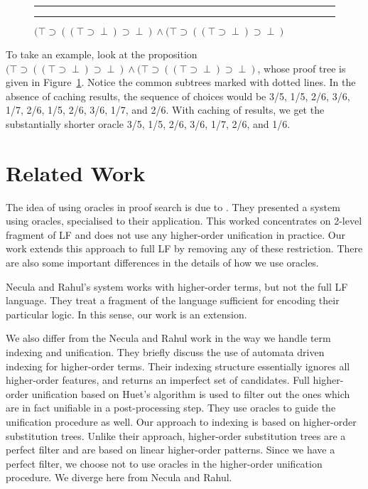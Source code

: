 \documentclass{acmconf}
\newcommand{\figfoot}{\vspace{1ex}\hrule}
\newcommand{\fighead}{\hrule\vspace{1.5ex}}
\begin{document}
\begin{figure}
\fighead
\hspace{-0.5in}
\vspace{1.5in}
\caption{\label{prooftree3}
$(\top\supset((\top\supset\perp)\supset\perp) \wedge
(\top\supset((\top\supset\perp)\supset\perp)$}
\figfoot
\end{figure}

To take an example, look at the proposition
$(\top\supset((\top\supset\perp)\supset\perp) \wedge
(\top\supset((\top\supset\perp)\supset\perp)$, whose proof tree is
given in Figure~\ref{prooftree3}. Notice the common subtrees marked
with dotted lines.  In the absence of caching results, the sequence of
choices would be 3/5, 1/5, 2/6, 3/6, 1/7, 2/6, 1/5, 2/6, 3/6, 1/7, and
2/6. With caching of results, we get the substantially shorter oracle
3/5, 1/5, 2/6, 3/6, 1/7, 2/6, and 1/6.

\section{Related Work}
The idea of using oracles in proof search is due to
\cite{necula+:oracles}.  They presented a system using oracles,
specialised to their application. This worked concentrates on 2-level
fragment of LF and does not use any higher-order unification in
practice. Our work extends this approach to full LF by removing any of
these restriction. There are also some important differences in the details of
how we use oracles.

Necula and Rahul's system works with higher-order terms, but not the
full LF language. They treat a fragment of the language sufficient for
encoding their particular logic. In this sense, our work is an
extension.  

We also differ from the Necula and Rahul work in the way we handle
term indexing and unification. They briefly discuss the use of
automata driven indexing for higher-order terms. Their indexing
structure essentially ignores all higher-order features, and returns
an imperfect set of candidates. Full higher-order unification based on
Huet's algorithm is used to filter out the ones which are in fact
unifiable in a post-processing step. They use oracles to guide the
unification procedure as well. Our approach to indexing is based on
higher-order substitution trees.  Unlike their approach, higher-order
substitution trees are a perfect filter and are based on linear
higher-order patterns.  Since we have a perfect filter, we choose not
to use oracles in the higher-order unification procedure. We diverge
here from Necula and Rahul. 
\end{document}
